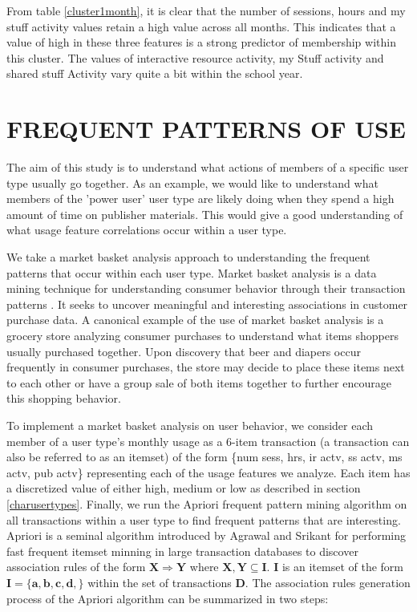 \documentclass{acm_proc_article-sp}
\begin{document}
From table \ref{cluster1month}, it is clear that the number of sessions, hours and my stuff activity values retain a high value across all months. This indicates that a value of high in these three features is a strong predictor of membership within this cluster.  The values of interactive resource activity, my Stuff activity and shared stuff Activity vary quite a bit within the school year.

\section{FREQUENT PATTERNS OF USE}
The aim of this study is to understand what actions of members of a specific user type usually go together. As an example, we would like to understand what members of the 'power user' user type are likely doing when they spend a high amount of time on publisher materials. This would give a good understanding of what usage feature correlations occur within a user type.

We take a market basket analysis approach to understanding the frequent patterns that occur within each user type. Market basket analysis is a data mining technique for understanding consumer behavior through their transaction patterns \cite{han2006data}. It seeks to uncover meaningful and interesting associations in customer purchase data. A canonical example of the use of  market basket analysis is a grocery store analyzing consumer purchases to understand what items shoppers usually purchased together. Upon discovery that beer and diapers occur frequently in consumer purchases, the store may decide to place these items next to each other or have a group sale of both items together to further encourage this shopping behavior.

To implement a market basket analysis on user behavior, we consider each member of a user type's monthly usage as a 6-item transaction (a transaction can also be referred to as an itemset) of the form \{num sess, hrs, ir actv, ss actv, ms actv, pub actv\} representing each of the usage features we analyze. Each item has a discretized value of either high, medium or low as described in section \ref{charusertypes}. Finally, we run the Apriori frequent pattern mining algorithm on all transactions within a user type to find frequent patterns that are interesting. Apriori is a seminal algorithm introduced by Agrawal and Srikant \cite{agrawal} for performing fast frequent itemset minning in large transaction databases to discover association rules of the form $\mathbf{{X} \Longrightarrow {Y}}$ where $\mathbf{X, Y \subseteq I}$. $\mathbf{I}$ is an itemset of the form $\mathbf{I = \{a,b,c,d,\}}$ within the set of transactions $\mathbf{D}$.
The association rules generation process of the Apriori algorithm can be summarized in two steps:
\end{document}
